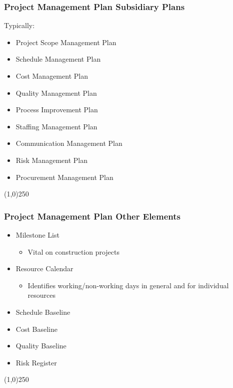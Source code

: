 \begin{frame}
\frametitle{Project Management Plan \hfill Subsidiary Plans}
Typically:	
\begin{itemize}
	\item Project Scope Management Plan
	\item Schedule Management Plan
	\item Cost Management Plan
	\item Quality Management Plan
	\item Process Improvement Plan
	\item Staffing Management Plan
	\item Communication Management Plan
	\item Risk Management Plan
	\item Procurement Management Plan
\end{itemize}
\end{frame}\begin{center}\line(1,0){250}\end{center}
%
%
\begin{frame}
\frametitle{Project Management Plan \hfill Other Elements}
\begin{itemize}
	\item Milestone List
		\begin{itemize}
			\item Vital on construction projects
		\end{itemize}
	\item Resource Calendar
		\begin{itemize}
			\item Identifies working/non-working days in general and for individual resources
		\end{itemize}
	\item Schedule Baseline
	\item Cost Baseline
	\item Quality Baseline
	\item Risk Register
\end{itemize}
\end{frame}\begin{center}\line(1,0){250}\end{center}
%
%

